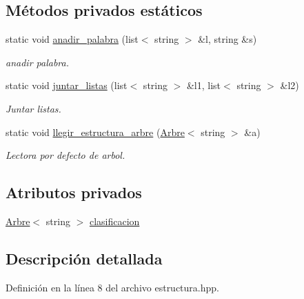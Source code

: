 \subsection*{Métodos privados estáticos}
\begin{DoxyCompactItemize}
\item 
static void \hyperlink{class_estructura_ae0d36375f1d4050785373f843f590e96}{anadir\-\_\-palabra} (list$<$ string $>$ \&l, string \&s)
\begin{DoxyCompactList}\small\item\em anadir palabra. \end{DoxyCompactList}\item 
static void \hyperlink{class_estructura_ae79425724c1ad61e334a55cbaa409cf0}{juntar\-\_\-listas} (list$<$ string $>$ \&l1, list$<$ string $>$ \&l2)
\begin{DoxyCompactList}\small\item\em Juntar listas. \end{DoxyCompactList}\item 
static void \hyperlink{class_estructura_a3f44d1bc5932abda1a7dc46f46ecbb0c}{llegir\-\_\-estructura\-\_\-arbre} (\hyperlink{class_arbre}{Arbre}$<$ string $>$ \&a)
\begin{DoxyCompactList}\small\item\em Lectora por defecto de arbol. \end{DoxyCompactList}\end{DoxyCompactItemize}
\subsection*{Atributos privados}
\begin{DoxyCompactItemize}
\item 
\hyperlink{class_arbre}{Arbre}$<$ string $>$ \hyperlink{class_estructura_a2db3e23215e96cbc8faae955dfb6df9f}{clasificacion}
\end{DoxyCompactItemize}


\subsection{Descripción detallada}


Definición en la línea 8 del archivo estructura.\-hpp.



